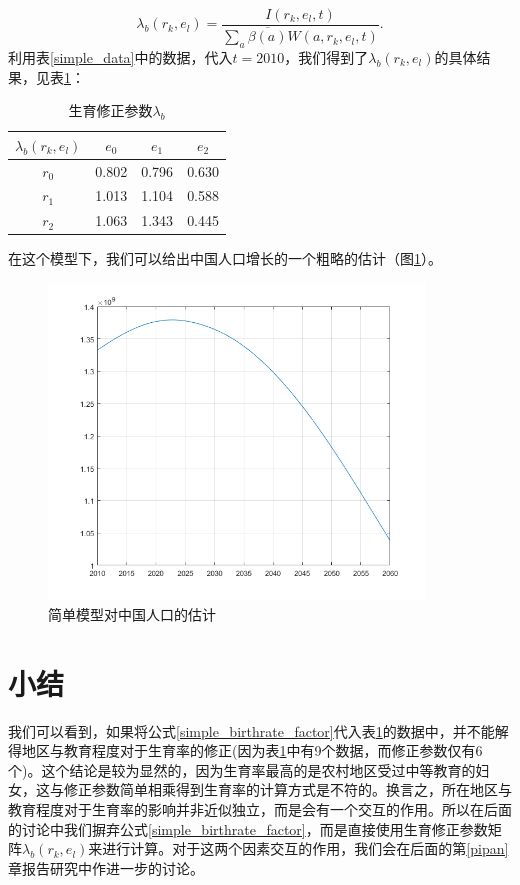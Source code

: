 \documentclass[a4paper]{article}
\begin{document}
	\begin{equation}
		\label{simple_lambda_b_calc}
		\lambda_b(r_k,e_l) = \frac{I(r_k, e_l, t)}{\sum_a \overline{\beta(a)} W(a, r_k, e_l, t)}.
	\end{equation}
利用表\ref{simple_data}中的数据，代入$t=2010$，我们得到了$\lambda_b(r_k,e_l)$的具体结果，见表\ref{simple_lambda_b_value}：
	\begin{table}[H]
		\centering
		\caption{生育修正参数$\lambda_b$}
		\label{simple_lambda_b_value}
		\begin{tabular}{c|ccc}
			$\lambda_b(r_k,e_l)$	&	$e_0$	&	$e_1$	&	$e_2$	\\
			\hline
			$r_0$								&	0.802	&	0.796	&	0.630	\\
			$r_1$								&	1.013	&	1.104	&	0.588	\\
			$r_2$								&	1.063	&	1.343	&	0.445	\\
		\end{tabular}
	\end{table}
在这个模型下，我们可以给出中国人口增长的一个粗略的估计（图\ref{simple_graph}）。
	\begin{figure}[htbp]
		\centering
		\includegraphics[width=10cm]{pics/simple_1.png}
		\caption{简单模型对中国人口的估计}
		\label{simple_graph}	
	\end{figure}
\section{小结}
我们可以看到，如果将公式\ref{simple_birthrate_factor}代入表\ref{simple_lambda_b_value}的数据中，并不能解得地区与教育程度对于生育率的修正(因为表\ref{simple_lambda_b_value}中有9个数据，而修正参数仅有6个)。这个结论是较为显然的，因为生育率最高的是农村地区受过中等教育的妇女，这与修正参数简单相乘得到生育率的计算方式是不符的。换言之，所在地区与教育程度对于生育率的影响并非近似独立，而是会有一个交互的作用。所以在后面的讨论中我们摒弃公式\ref{simple_birthrate_factor}，而是直接使用生育修正参数矩阵$\lambda_b(r_k,e_l)$来进行计算。对于这两个因素交互的作用，我们会在后面的第\ref{pipan}章报告研究中作进一步的讨论。
	
\end{document}

